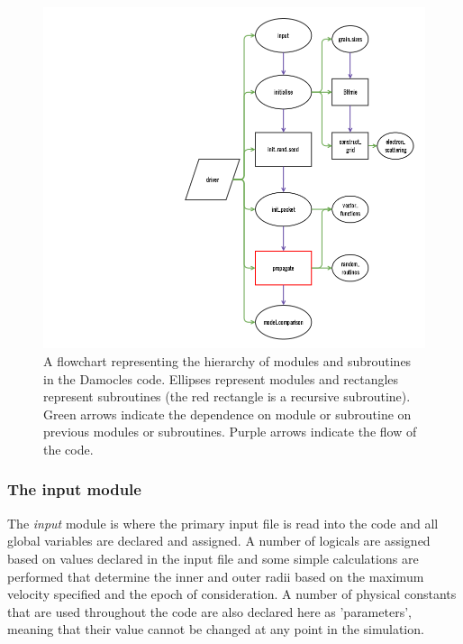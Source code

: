 			\begin{centering}
	\begin{figure}
	\includegraphics[scale=0.8, trim=110mm 0mm 0mm 5mm]{chapters/chapter2/code_modules_flowchart.png}
	\caption{A flowchart representing the hierarchy of modules and subroutines in the Damocles code.  Ellipses represent modules and rectangles represent subroutines (the red rectangle is a recursive subroutine).  Green arrows indicate the dependence on module or subroutine on previous modules or subroutines.  Purple arrows indicate the flow of the code.}
	\label{fig:flowchart_mods}
	\end{figure}
	\end{centering}
		
		\subsubsection{The input module}
		The \textit{input} module is where the primary input file is read into the code and all global variables are declared and assigned.  A number of logicals are assigned based on values declared in the input file and some simple calculations are performed that determine the inner and outer radii based on the maximum velocity specified and the epoch of consideration.  A number of physical constants that are used throughout the code are also declared here as 'parameters', meaning that their value cannot be changed at any point in the simulation.
		
